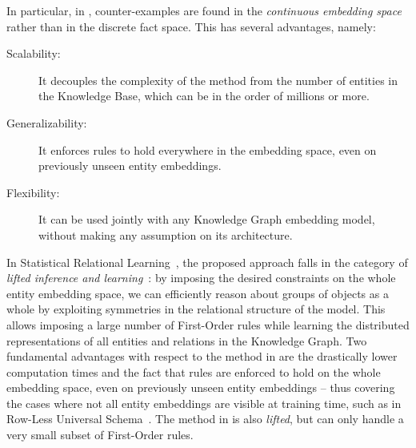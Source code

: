 %
In particular, in \ARI, counter-examples are found in the \emph{continuous embedding space} rather than in the discrete fact space.
%
This has several advantages, namely:
%
\begin{description}
%
 \item[Scalability:] It decouples the complexity of the method from the number of entities in the Knowledge Base, which can be in the order of millions or more.
%
 \item[Generalizability:] It enforces rules to hold everywhere in the embedding space, even on previously unseen entity embeddings.
%
 \item[Flexibility:] It can be used jointly with any Knowledge Graph embedding model, without making any assumption on its architecture.
%
\end{description}
%

%
In Statistical Relational Learning~\cite{getoor:srlbook07}, the proposed approach falls in the category of \emph{lifted inference and learning}~\cite{DBLP:conf/ijcai/Poole03,DBLP:conf/ijcai/BrazAR05}: by imposing the desired constraints on the whole entity embedding space, we can efficiently reason about groups of objects as a whole by exploiting symmetries in the relational structure of the model.
%
This allows imposing a large number of First-Order rules while learning the distributed representations of all entities and relations in the Knowledge Graph.
%
Two fundamental advantages with respect to the method in \cite{DBLP:conf/naacl/RocktaschelSR15} are the drastically lower computation times and the fact that rules are enforced to hold on the whole embedding space, even on previously unseen entity embeddings -- thus covering the cases where not all entity embeddings are visible at training time, such as in Row-Less Universal Schema~\cite{DBLP:journals/corr/VergaM16}.
%
The method in \cite{DBLP:conf/emnlp/DemeesterRR16} is also \emph{lifted}, but can only handle a very small subset of First-Order rules.
%
